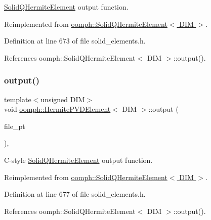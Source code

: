 \hyperlink{classoomph_1_1SolidQHermiteElement}{Solid\+Q\+Hermite\+Element} output function. 



Reimplemented from \hyperlink{classoomph_1_1SolidQHermiteElement_ab86bacc26f319f3266e6de9cfc5b82af}{oomph\+::\+Solid\+Q\+Hermite\+Element$<$ D\+I\+M $>$}.



Definition at line 673 of file solid\+\_\+elements.\+h.



References oomph\+::\+Solid\+Q\+Hermite\+Element$<$ D\+I\+M $>$\+::output().

\mbox{\label{classoomph_1_1HermitePVDElement_a5567656681b134890e6940972a2461d5}} 
\subsubsection{\texorpdfstring{output()}{output()}\hspace{0.1cm}{\footnotesize\ttfamily [3/4]}}
{\footnotesize\ttfamily template$<$unsigned D\+IM$>$ \\
void \hyperlink{classoomph_1_1HermitePVDElement}{oomph\+::\+Hermite\+P\+V\+D\+Element}$<$ D\+IM $>$\+::output (\begin{DoxyParamCaption}\item[{F\+I\+LE $\ast$}]{file\+\_\+pt }\end{DoxyParamCaption})\hspace{0.3cm}{\ttfamily [inline]}, {\ttfamily [virtual]}}



C-\/style \hyperlink{classoomph_1_1SolidQHermiteElement}{Solid\+Q\+Hermite\+Element} output function. 



Reimplemented from \hyperlink{classoomph_1_1SolidQHermiteElement_ae4f251ca932301e92e1b897cec6f0459}{oomph\+::\+Solid\+Q\+Hermite\+Element$<$ D\+I\+M $>$}.



Definition at line 677 of file solid\+\_\+elements.\+h.



References oomph\+::\+Solid\+Q\+Hermite\+Element$<$ D\+I\+M $>$\+::output().

